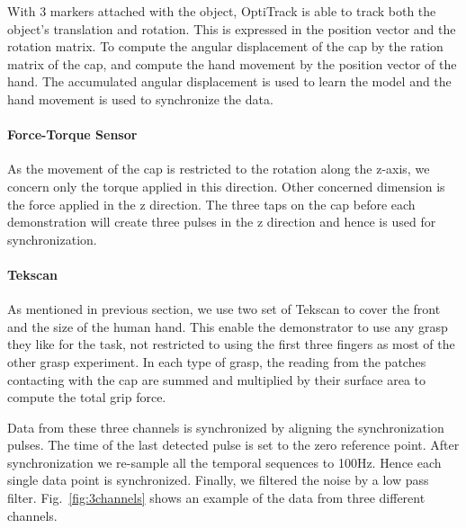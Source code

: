 With 3 markers attached with the object, OptiTrack is able to track both the object's translation and rotation. This is expressed in the position vector and the rotation matrix. To compute the angular displacement of the cap by the ration matrix of the cap, and compute the hand movement by the position vector of the hand. The accumulated angular displacement is used to learn the model and the hand movement is used to synchronize the data.

\paragraph{Force-Torque Sensor}

As the movement of the cap is restricted to the rotation along the z-axis, we concern only the torque applied in this direction.
Other concerned dimension is the force applied in the z direction. The three taps on the cap before each demonstration will create three pulses in the z direction and hence is used for synchronization.



\paragraph{Tekscan}

As mentioned in previous section, we use two set of Tekscan to cover the front and the size of the human hand. This enable the demonstrator to use any grasp they like for the task, not restricted to using the first three fingers as most of the other grasp experiment. In each type of grasp, the reading from the patches contacting with the cap are summed and multiplied by their surface area to compute the total grip force.

Data from these three channels is synchronized by aligning the synchronization pulses. The time of the last detected pulse is set to the zero reference point. After synchronization we re-sample all the temporal sequences to 100Hz. Hence each single data point is synchronized. Finally, we filtered the noise by a low pass filter. Fig.~\ref{fig:3channels} shows an example of the data from three different channels.




